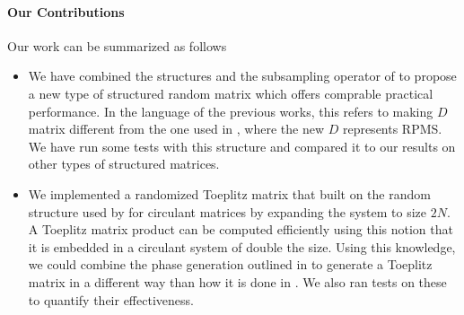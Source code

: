 \paragraph{Our Contributions}
Our work can be summarized as follows
\begin{itemize}
	\item We have combined the structures \cite{doetal} and the subsampling operator 
		of \cite{romberg2009} to propose a new type of structured random matrix which offers 
		comprable practical performance. In the language of the previous works, this refers
		to making $D$ matrix different from the one used in \cite{doetal}, where the new $D$
		represents RPMS. We have run some tests with this structure and compared it to 
		our results on other types of structured matrices.
	\item We implemented a randomized Toeplitz matrix that built on the random structure
		used by \cite{romberg2009} for circulant matrices by expanding the system to size
		$2N$. A Toeplitz matrix product can be computed efficiently using this notion that 
		it is embedded in a circulant system of double the size. Using this knowledge, we 
		could combine the phase generation outlined in \cite{romberg2009} to generate a 
		Toeplitz matrix in a different way than how it is done in \cite{wotao}. We also ran 
		tests on these to quantify their effectiveness. 
\end{itemize}
